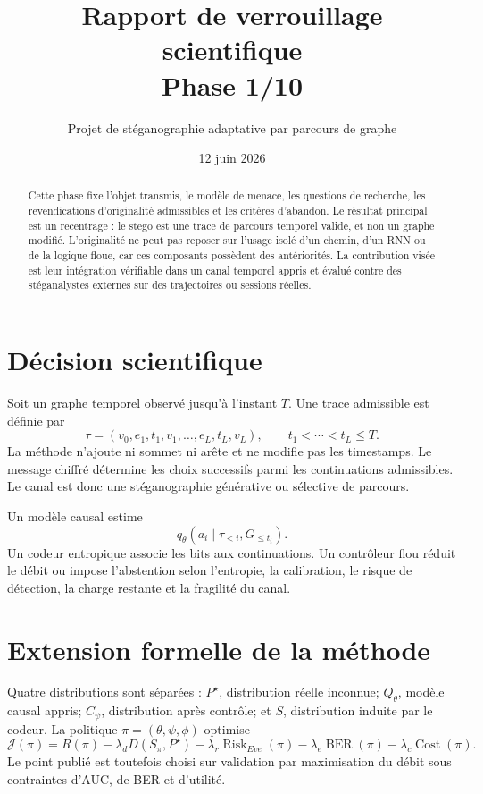 \documentclass[11pt,a4paper]{article}
\title{Rapport de verrouillage scientifique\\Phase 1/10}
\author{Projet de stéganographie adaptative par parcours de graphe}
\date{12 juin 2026}
\begin{document}
\maketitle

\begin{abstract}
Cette phase fixe l'objet transmis, le modèle de menace, les questions de
recherche, les revendications d'originalité admissibles et les critères
d'abandon. Le résultat principal est un recentrage : le stego est une trace
de parcours temporel valide, et non un graphe modifié. L'originalité ne peut
pas reposer sur l'usage isolé d'un chemin, d'un RNN ou de la logique floue,
car ces composants possèdent des antériorités. La contribution visée est leur
intégration vérifiable dans un canal temporel appris et évalué contre des
stéganalystes externes sur des trajectoires ou sessions réelles.
\end{abstract}

\section{Décision scientifique}

Soit un graphe temporel observé jusqu'à l'instant \(T\). Une trace admissible
est définie par
\[
\tau=(v_0,e_1,t_1,v_1,\ldots,e_L,t_L,v_L),\qquad
t_1<\cdots<t_L\leq T.
\]
La méthode n'ajoute ni sommet ni arête et ne modifie pas les timestamps. Le
message chiffré détermine les choix successifs parmi les continuations
admissibles. Le canal est donc une stéganographie générative ou sélective de
parcours.

Un modèle causal estime
\[
q_\theta(a_i\mid\tau_{<i},G_{\leq t_i}).
\]
Un codeur entropique associe les bits aux continuations. Un contrôleur flou
réduit le débit ou impose l'abstention selon l'entropie, la calibration, le
risque de détection, la charge restante et la fragilité du canal.

\section{Extension formelle de la méthode}

Quatre distributions sont séparées : \(P^\star\), distribution réelle
inconnue; \(Q_\theta\), modèle causal appris; \(C_\psi\), distribution après
contrôle; et \(S\), distribution induite par le codeur. La politique
\(\pi=(\theta,\psi,\phi)\) optimise
\[
\mathcal J(\pi)=R(\pi)
-\lambda_dD(S_\pi,P^\star)
-\lambda_r\operatorname{Risk}_{Eve}(\pi)
-\lambda_e\operatorname{BER}(\pi)
-\lambda_c\operatorname{Cost}(\pi).
\]
Le point publié est toutefois choisi sur validation par maximisation du débit
sous contraintes d'AUC, de BER et d'utilité.
\end{document}

